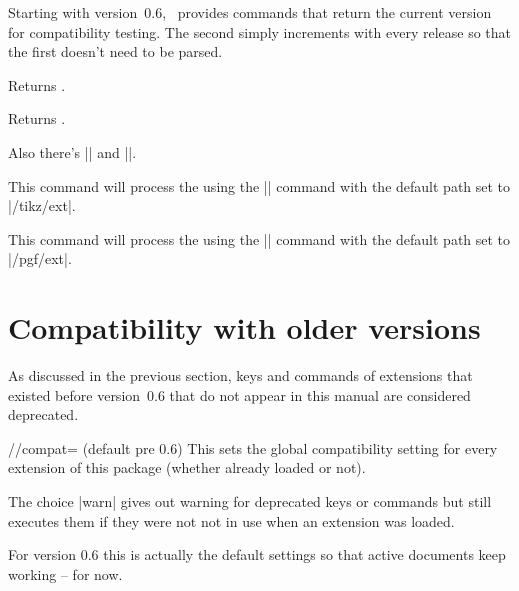 \begin{multicols}{2}
Starting with version~0.6,
\tikzextname\ provides commands that return the current version for compatibility testing.
The second simply increments with every release
so that the first doesn't need to be parsed.
\begin{command}{\tikzextversion}
  Returns \texttt{\tikzextversion}.
\end{command}
\begin{command}{\tikzextversionnumber}
  Returns \texttt{\tikzextversionnumber}.
\end{command}
%
Also there's |\tikzextset| and |\pgfextset|.
\begin{command}{\tikzextset{}}
  This command will process the  using the
  |\pgfkeys| command with the default path set to |/tikz/ext|.
\end{command}
\begin{command}{\pgfextset{}}
  This command will process the  using the
  |\pgfkeys| command with the default path set to |/pgf/ext|.
\end{command}

\newcolumn
\section{Compatibility with older versions}
As discussed in the previous section,
keys and commands of extensions that existed before version~0.6
that do not appear in this manual are considered deprecated.

\begin{key}{/\tikzext/compat= (default pre 0.6)}
  This sets the global compatibility setting for every extension of this package
  (whether already loaded or not).

  The choice |warn| gives out warning for deprecated keys or commands
  but still executes them if they were not not in use when an extension was loaded.
  
  For version 0.6 this is actually the default settings so that active documents
  keep working -- for now.
  

\end{key}
\end{multicols}

